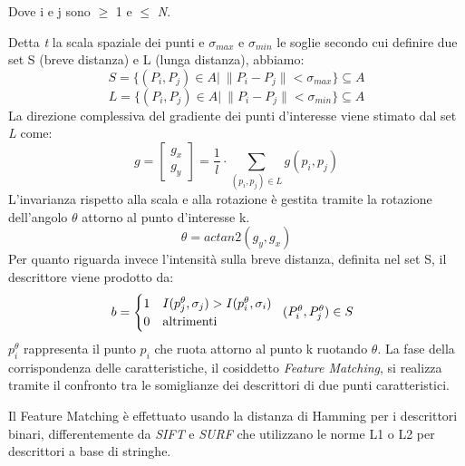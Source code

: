 \noindent Dove i e j sono \(\geq\) 1 e \(\leq\) \textit{N}.\par
\noindent Detta \textit{t} la scala spaziale dei punti e \(\sigma_{max}\) e \(\sigma_{min}\) le soglie secondo cui definire due set S (breve distanza) e L (lunga distanza), abbiamo:
\begin{equation}
	S = \{ (P_{i}, P_{j}) \in A |\ \| P_{i} - P_{j} \| < \sigma_{max}\} \subseteq A
\end{equation}
\begin{equation}
	L = \{ (P_{i}, P_{j}) \in A |\ \| P_{i} - P_{j} \| < \sigma_{min}\} \subseteq A	
\end{equation}
\noindent La direzione complessiva del gradiente dei punti d'interesse viene stimato dal set \textit{L} come:
\begin{equation}
	g = \begin{bmatrix} g_{x} \\ g_{y} \end{bmatrix} = \frac{1}{l} \cdot \sum_{(p_{i}, p_{j}) \in L} g(p_{i}, p_{j})
\end{equation}
\noindent L'invarianza rispetto alla scala e alla rotazione è gestita tramite la rotazione dell'angolo \(\theta\) attorno al punto d'interesse k.
\begin{equation}
	\theta = {actan2} (g_{y}, g_{x})
\end{equation}
\noindent Per quanto riguarda invece l'intensità sulla breve distanza, definita nel set S, il descrittore viene prodotto da:
\begin{equation}
  b =
    \begin{cases}
      1 & \text{\(I(p_{j}^{\theta}, \sigma_{j}) > I(p_{i}^{\theta}, \sigma_{i})\)}  \\
      0 & \text{altrimenti}
    \end{cases}       
    \begin{tabular}{c}
      \text{\((P_{i}^{\theta}, P_{j}^{\theta}) \in S\)}
    \end{tabular}
\end{equation}
\noindent \(p_{i}^{\theta}\) rappresenta il punto \(p_{i}\) che ruota attorno al punto k ruotando \(\theta\). \hfill \break
\noindent La fase della corrispondenza delle caratteristiche, il cosiddetto \textit{Feature Matching}, si realizza tramite il confronto tra le somiglianze dei descrittori di due punti caratteristici. \par
\noindent Il Feature Matching è effettuato usando la distanza di Hamming per i descrittori binari, differentemente da \textit{SIFT} e \textit{SURF} che utilizzano le norme L1 o L2 per descrittori a base di stringhe. \par
